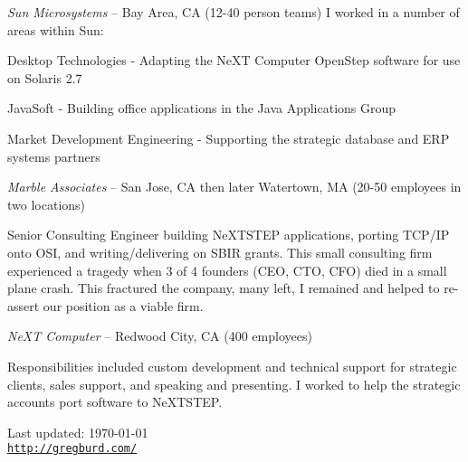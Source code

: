 \documentclass[letterpaper]{article}
\def\footerlink{http://gregburd.com/}
\renewenvironment{itemize}{
  \begin{list}{}{
    \setlength{\leftmargin}{1.5em}
  }
}{
  \end{list}
}
\begin{document}
\begin{itemize}
\item {\it Sun Microsystems} -- Bay Area, CA (12-40 person teams)
I worked in a number of areas within Sun:
\begin{itemize}
\item Desktop Technologies - Adapting the NeXT Computer OpenStep software for use on Solaris 2.7
\item JavaSoft - Building office applications in the Java Applications Group
\item Market Development Engineering - Supporting the strategic database and ERP systems partners
\end{itemize}

\item {\it Marble Associates} -- San Jose, CA then later Watertown, MA (20-50 employees in two locations)

Senior Consulting Engineer building NeXTSTEP applications, porting TCP/IP onto OSI, and writing/delivering on SBIR grants. This small consulting firm experienced a tragedy when 3 of 4 founders (CEO, CTO, CFO) died in a small plane crash. This fractured the company, many left, I remained and helped to re-assert our position as a viable firm.

\item {\it NeXT Computer} -- Redwood City, CA (400 employees)

Responsibilities included custom development and technical support for strategic clients, sales support, and speaking and presenting. I worked to help the strategic accounts port software to NeXTSTEP.
\end{itemize}

\bigskip

\begin{center}
  \begin{footnotesize}
    Last updated: \today \\
    \href{\footerlink}{\texttt{\footerlink}}
  \end{footnotesize}
\end{center}
\end{document}
